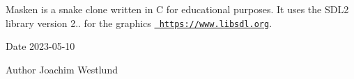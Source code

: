 Masken is a snake clone written in C for educational purposes. It uses the S\+D\+L2 library version 2.. for the graphics \href{https://www.libsdl.org}{\texttt{ https\+://www.\+libsdl.\+org}}.

\begin{DoxyDate}{Date}
2023-\/05-\/10 
\end{DoxyDate}
\begin{DoxyAuthor}{Author}
Joachim Westlund 
\end{DoxyAuthor}
